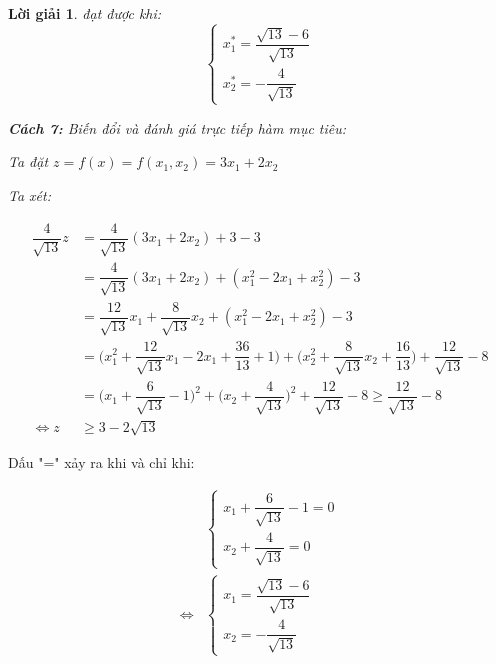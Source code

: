 \documentclass[14pt, a4paper]{article}
\theoremstyle{sltheorem}
\theoremstyle{soltheorem}
\newtheorem*{loigiai}{Lời giải}
\begin{document}
\begin{loigiai}
        đạt được khi:
        \begin{equation*}
            \begin{cases} 
                x_1^* = \dfrac{\sqrt{13} - 6}{\sqrt{13}} \\ 
                x_2^* = - \dfrac{4}{\sqrt{13}} 
            \end{cases}
        \end{equation*}

        \textbf{Cách 7:} Biến đổi và đánh giá trực tiếp hàm mục tiêu:

        Ta đặt $z = f(x) = f(x_1, x_2) = 3 x_1 + 2 x_2$

        Ta xét:

        \begin{equation*}
            \begin{aligned}
            \dfrac{4}{\sqrt{13}} z &= \dfrac{4}{\sqrt{13}} (3 x_1 + 2 x_2 ) + 3 - 3 \\
                                & = \dfrac{4}{\sqrt{13}} (3 x_1 + 2 x_2 ) + (x_1^2 - 2x_1 + x_2^2) - 3 \\
                                & = \dfrac{12}{\sqrt{13}} x_1 + \dfrac{8}{\sqrt{13}} x_2 + (x_1^2 - 2x_1 + x_2^2) - 3 \\
                                & = \Big ( x_1^2 + \dfrac{12}{\sqrt{13}} x_1 - 2 x_1 + \dfrac{36}{13} + 1 \Big) + \Big ( x_2^2 + \dfrac{8}{\sqrt{13}}x_2 + \dfrac{16}{13} \Big) + \dfrac{12}{\sqrt{13}} - 8 \\
                                & = \Big ( x_1 + \dfrac{6}{\sqrt{13}} - 1 \Big)^2 + \Big( x_2 + \dfrac{4}{\sqrt{13}} \Big)^2 + \dfrac{12}{\sqrt{13}} - 8 \geq \dfrac{12}{\sqrt{13}} - 8 \\
                        \Leftrightarrow z &\geq 3 - 2\sqrt{13}
            \end{aligned}
        \end{equation*}
    \end{loigiai}

    Dấu "=" xảy ra khi và chỉ khi:

    \begin{equation*}
        \begin{aligned}
        &\begin{cases}
            x_1 + \dfrac{6}{\sqrt{13}} - 1 = 0 \\ 
            x_2 + \dfrac{4}{\sqrt{13}} = 0 
        \end{cases} \\
        \Leftrightarrow & \begin{cases}
            x_1 = \dfrac{\sqrt{13} - 6}{\sqrt{13}} \\ 
            x_2 = - \dfrac{4}{\sqrt{13}} 
        \end{cases}
        \end{aligned}
    \end{equation*}
\end{document}
